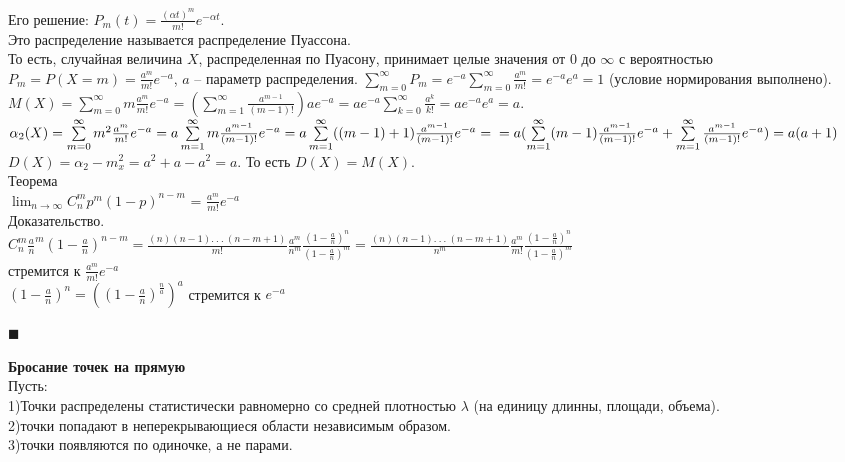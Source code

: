 \documentclass[russian, 12pt, fleqn]{article}
\begin{document}
Его решение: $P_m(t) = \frac{(\alpha t)^m}{m!} e^{-\alpha t}$.\\
Это распределение называется распределение Пуассона.\\
То есть, случайная величина $X$, распределенная по Пуасону, принимает целые значения от $0$ до $\infty$ с вероятностью $P_m=P(X=m) = \frac{a^m}{m!}e^{-a}$, $a$ -- параметр распределения. $\sum\limits_{m=0}^{\infty}P_m = e^{-a}\sum\limits_{m=0}^{\infty} \frac{a^m}{m!}  = e^{-a}e^a = 1$  (условие нормирования выполнено).
$M(X) = \sum\limits_{m=0}^{\infty} m\frac{a^m}{m!}e^{-a} = (\sum\limits_{m=1}^{\infty} \frac{a^{m-1}}{(m-1)!})ae^{-a} = ae^{-a}\sum\limits_{k=0}^{\infty} \frac{a^k}{k!} = ae^{-a}e^{a} = a$.\\
$\alpha_2(X) = \sum\limits_{m=0}^{\infty} m^2\frac{a^m}{m!}e^{-a} = a\sum\limits_{m=1}^{\infty} m\frac{a^{m-1}}{(m-1)!}e^{-a} = a \sum\limits_{m=1}^{\infty} ((m-1)+1)\frac{a^{m-1}}{(m-1)!}e^{-a} =\\= a(\sum\limits_{m=1}^{\infty}(m-1)\frac{a^{m-1}}{(m-1)!}e^{-a} + \sum\limits_{m=1}^{\infty}\frac{a^{m-1}}{(m-1)!}e^{-a})=a(a+1)$\\
$D(X) = \alpha_2 - m_x^2 = a^2 + a - a^2 = a$. То есть $D(X)=M(X)$.\\
$\textbf{Теорема}$\\
$\displaystyle{\lim_{n \to {\infty}}  C^m_np^m(1-p)^{n-m}}$ = $\frac{a^m}{m!}e^{-a}$\\
Доказательство.\\
$C^m_n\frac{a}{n}^m(1-\frac{a}{n})^{n-m} = \frac{(n)(n-1).\ .\ .\ (n-m+1)}{m!} \frac{a^m}{n^m} \frac{(1-\frac{a}{n})^n}{(1-\frac{a}{n})^m} = 
\frac{(n)(n-1).\ .\ .\ (n-m+1)}{n^m}  \frac{a^m}{m!} \frac{(1-\frac{a}{n})^n}{(1-\frac{a}{n})^m}$  \\стремится к $\frac{a^m}{m!} e^{-a}$\\
$(1-\frac{a}{n})^n = ((1-\frac{a}{n})^\frac{n}{a})^a$ стремится к $e^{-a}$\\
\begin{flushright}\(\blacksquare\)\end{flushright}
\textbf{Бросание точек на прямую}\\
Пусть: \\
1)Точки распределены статистически равномерно со средней плотностью $\lambda$ (на единицу длинны, площади, объема).\\
2)точки попадают в неперекрывающиеся области независимым образом.\\
3)точки появляются по одиночке, а не парами.\\
\end{document}
